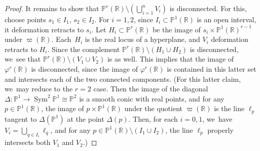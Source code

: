 \documentclass[JEP,XML,SOM,Unicode,NoEqCountersInSection,published]{cedram}
\let\bb\mathbb\let\Bbb\mathbb
\theoremstyle{plain}
\theoremstyle{definition}
\DeclareMathOperator{\Sym}{Sym}
\let\phi\varphi
\renewcommand\P{\mathbb{P}}
\newcommand\R{\mathbb{R}}
\begin{document}
\begin{proof}
It remains to show that $\P^r(\R)\setminus (\bigcup_{i=1}^n V_i)$ is disconnected. For this, choose points \(s_1\in I_1\), \(s_2\in I_2\). For \(i=1,2\), since \(I_i \subset \bb P^1(\bb R)\) is an open interval, it deformation retracts to \(s_i\). Let \(H_i \subset \bb P^r(\bb R)\) be the image of \(s_i\times \P^1(\R)^{r-1}\) under \(\varpi(\bb R)\). Each~\(H_i\) is the real locus of a hyperplane, and \(V_i\) deformation retracts to \(H_i\). Since the complement \(\bb P^r(\bb R)\setminus(H_1 \cup H_2)\) is disconnected, we~see that \(\bb P^r(\bb R)\setminus(V_1 \cup V_2)\) is as well. This implies that the image of \(\phi^r(\bb R)\) is disconnected, since the image of \(\phi^r(\bb R)\) is contained in this latter set and intersects each of the two connected components. (For this latter claim, we~may reduce to the \(r=2\) case. Then the image of the diagonal \(\Delta\colon \mathbb P^1\to\Sym^2\mathbb P^1\cong\mathbb P^2\) is a smooth conic with real points, and for any \(p\in\bb P^1(\bb R)\), the image of \(p\times \bb P^1(\bb R)\) under the quotient \(\varpi(\bb R)\) is the line \(\ell_p\) tangent to \(\Delta(\mathbb P^1)\) at the point \(\Delta(p)\).
Then, for each \(i=0,1\), we~have \(V_i = \bigcup_{q\in I_i} \ell_q\), and for any \(p\in\bb P^1(\bb R)\setminus(I_1\cup I_2)\), the line \(\ell_p\) properly intersects both \(V_1\) and \(V_2\).)
\end{proof}
\end{document}
